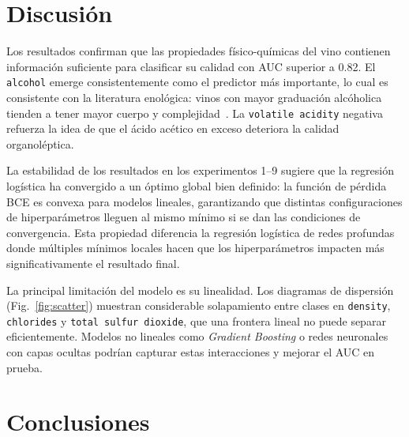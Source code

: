 \documentclass[conference]{IEEEtran}
\begin{document}
\section{Discusi\'{o}n}

Los resultados confirman que las propiedades f\'{i}sico-qu\'{i}micas del vino contienen informaci\'{o}n suficiente para clasificar su calidad con AUC superior a 0.82. El \texttt{alcohol} emerge consistentemente como el predictor m\'{a}s importante, lo cual es consistente con la literatura enol\'{o}gica: vinos con mayor graduaci\'{o}n alc\'{o}holica tienden a tener mayor cuerpo y complejidad~\cite{cortez2009}. La \texttt{volatile acidity} negativa refuerza la idea de que el \'{a}cido ac\'{e}tico en exceso deteriora la calidad organol\'{e}ptica.

La estabilidad de los resultados en los experimentos 1--9 sugiere que la regresi\'{o}n log\'{i}stica ha convergido a un \'{o}ptimo global bien definido: la funci\'{o}n de p\'{e}rdida BCE es convexa para modelos lineales, garantizando que distintas configuraciones de hiperpar\'{a}metros lleguen al mismo m\'{i}nimo si se dan las condiciones de convergencia. Esta propiedad diferencia la regresi\'{o}n log\'{i}stica de redes profundas donde m\'{u}ltiples m\'{i}nimos locales hacen que los hiperpar\'{a}metros impacten m\'{a}s significativamente el resultado final.

La principal limitaci\'{o}n del modelo es su linealidad. Los diagramas de dispersi\'{o}n (Fig.~\ref{fig:scatter}) muestran considerable solapamiento entre clases en \texttt{density}, \texttt{chlorides} y \texttt{total sulfur dioxide}, que una frontera lineal no puede separar eficientemente. Modelos no lineales como \textit{Gradient Boosting} o redes neuronales con capas ocultas podr\'{i}an capturar estas interacciones y mejorar el AUC en prueba.

\section{Conclusiones}
\end{document}
